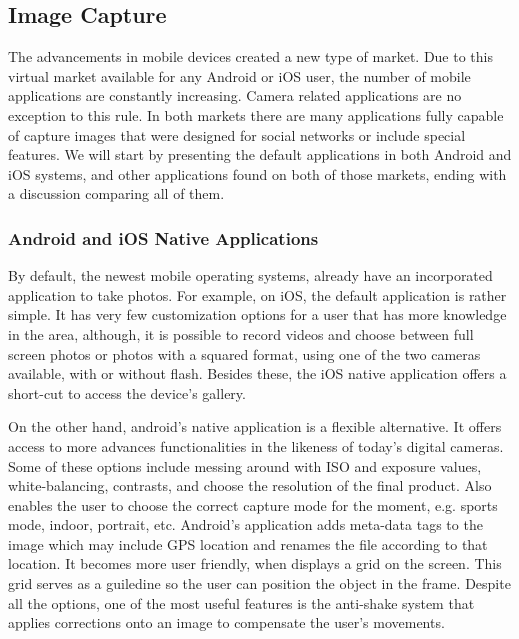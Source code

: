 \subsection{Image Capture}

The advancements in mobile devices created a new type of market. Due to this virtual market available for any Android or iOS user, the number of mobile applications are constantly increasing. Camera related applications are no exception to this rule. In both markets there are many applications fully capable of capture images that were designed for social networks or include special features. We will start by presenting the default applications in both Android and iOS systems, and other applications found on both of those markets, ending with a discussion comparing all of them.

\subsubsection{Android and iOS Native Applications}

By default, the newest mobile operating systems, already have an incorporated application to take photos. For example, on iOS, the default application is rather simple. It has very few customization options for a user that has more knowledge in the area, although, it is possible to record videos and choose between full screen photos or photos with a squared format, using one of the two cameras available, with or without flash. Besides these, the iOS native application offers a short-cut to access the device's gallery.

On the other hand, android's native application is a flexible alternative. It offers access to more advances functionalities in the likeness of today's digital cameras.
Some of these options include messing around with ISO and exposure values, white-balancing, contrasts, and choose the resolution of the final product. Also enables the user to choose the correct capture mode for the moment, e.g. sports mode, indoor, portrait, etc.
Android's application adds meta-data tags to the image which may include GPS location and renames the file according to that location. It becomes more user friendly, when displays a grid on the screen. This grid serves as a guiledine so the user can position the object in the frame. Despite all the options, one of the most useful features is the anti-shake system that applies corrections onto an image to compensate the user's movements.



